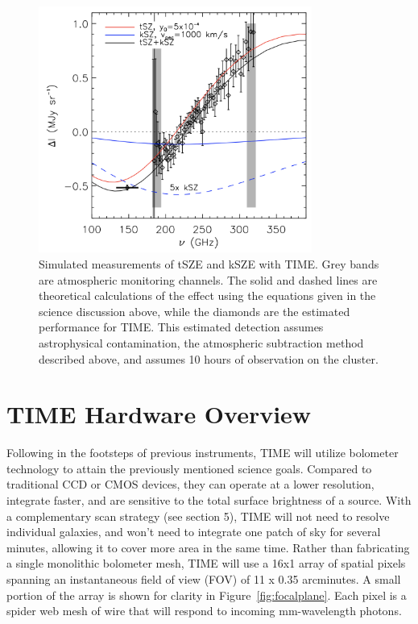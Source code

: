 \documentclass[manuscript]{aastex}
\begin{document}
\begin{figure}[H]
\centering
\captionsetup{width=0.8\textwidth}
\includegraphics[width=0.8\textwidth]{time1.png}
\caption[Expected TIME kSZE \& tSZE Measurements]{Simulated measurements of tSZE and kSZE with TIME. Grey bands are atmospheric monitoring channels. The solid and dashed lines are theoretical calculations of the effect using the equations given in the science discussion above, while the diamonds are the estimated performance for TIME. This estimated detection assumes astrophysical contamination, the atmospheric subtraction method described above, and assumes 10 hours of observation on the cluster.}
\label{fig:time1}
\end{figure}

\section{TIME Hardware Overview}
Following in the footsteps of previous instruments, TIME will utilize bolometer technology to attain the previously mentioned science goals. Compared to traditional CCD or CMOS devices, they can operate at a lower resolution, integrate faster, and are sensitive to the total surface brightness of a source. With a complementary scan strategy (see section 5), TIME will not need to resolve individual galaxies, and won't need to integrate one patch of sky for several minutes, allowing it to cover more area in the same time. Rather than fabricating a single monolithic bolometer mesh, TIME will use a 16x1 array of spatial pixels spanning an instantaneous field of view (FOV) of 11 x 0.35 arcminutes. A small portion of the array is shown for clarity in Figure~\ref{fig:focalplane}. Each pixel is a spider web mesh of wire that will respond to incoming mm-wavelength photons.
\end{document}
